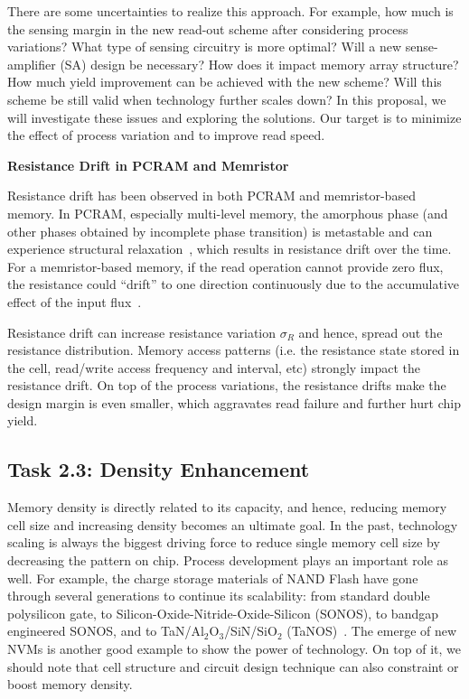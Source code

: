 There are some uncertainties to realize this approach. For example, how much is the sensing margin in the new read-out scheme after considering process variations? What type of sensing circuitry is more optimal? Will a new sense-amplifier (SA) design be necessary? How does it impact memory array structure? How much yield improvement can be achieved with the new scheme? Will this scheme be still valid when technology further scales down? In this proposal, we will investigate these issues and exploring the solutions. Our target is to minimize the effect of process variation and to improve read speed.

\squishlist \item {\textbf{Resistance Drift in PCRAM and Memristor}} \squishend

Resistance drift has been observed in both PCRAM and memristor-based memory. In PCRAM, especially multi-level memory, the amorphous phase (and other phases obtained by incomplete phase transition) is metastable and can experience structural relaxation~\cite{Pirovano04}, which results in resistance drift over the time. For a memristor-based memory, if the read operation cannot provide zero flux, the resistance could ``drift'' to one direction continuously due to the accumulative effect of the input flux~\cite{Ho09}.

Resistance drift can increase resistance variation $\sigma_R$ and hence, spread out the resistance distribution. Memory access patterns (i.e. the resistance state stored in the cell, read/write access frequency and interval, etc) strongly impact the resistance drift. On top of the process variations, the resistance drifts make the design margin is even smaller, which aggravates read failure and further hurt chip yield.


\subsection{Task 2.3: Density Enhancement}

Memory density is directly related to its capacity, and hence, reducing memory cell size and increasing density becomes an ultimate goal. In the past, technology scaling is always the biggest driving force to reduce single memory cell size by decreasing the pattern on chip. Process development plays an important role as well. For example, the charge storage materials of NAND Flash have gone through several generations to continue its scalability: from standard double polysilicon gate, to Silicon-Oxide-Nitride-Oxide-Silicon (SONOS), to bandgap engineered SONOS, and to TaN/Al$_2$O$_3$/SiN/SiO$_2$ (TaNOS)~\cite{Lu09}. The emerge of new NVMs is another good example to show the power of technology. On top of it, we should note that cell structure and circuit design technique can also constraint or boost memory density.

